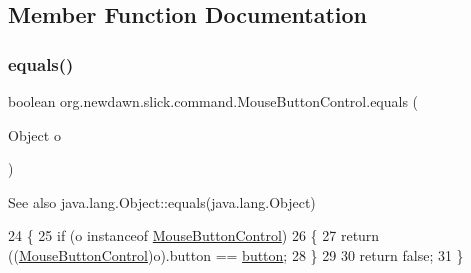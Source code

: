 \subsection{Member Function Documentation}
\mbox{\label{classorg_1_1newdawn_1_1slick_1_1command_1_1_mouse_button_control_afa555e10d087536374f9590a08dfb529}} 
\subsubsection{\texorpdfstring{equals()}{equals()}}
{\footnotesize\ttfamily boolean org.\+newdawn.\+slick.\+command.\+Mouse\+Button\+Control.\+equals (\begin{DoxyParamCaption}\item[{Object}]{o }\end{DoxyParamCaption})\hspace{0.3cm}{\ttfamily [inline]}}

\begin{DoxySeeAlso}{See also}
java.\+lang.\+Object\+::equals(java.\+lang.\+Object) 
\end{DoxySeeAlso}

\begin{DoxyCode}
24                                     \{
25         \textcolor{keywordflow}{if} (o instanceof \mbox{\hyperlink{classorg_1_1newdawn_1_1slick_1_1command_1_1_mouse_button_control_a47ab20a1f4c08a5fc9201c2e14511fe2}{MouseButtonControl}}) 
26         \{
27             \textcolor{keywordflow}{return} ((\mbox{\hyperlink{classorg_1_1newdawn_1_1slick_1_1command_1_1_mouse_button_control_a47ab20a1f4c08a5fc9201c2e14511fe2}{MouseButtonControl}})o).button == \mbox{\hyperlink{classorg_1_1newdawn_1_1slick_1_1command_1_1_mouse_button_control_acb6114b65f6e0fd07d4d820d6bd2c04c}{button}};
28         \}
29         
30         \textcolor{keywordflow}{return} \textcolor{keyword}{false};
31     \}
\end{DoxyCode}
\mbox{\label{classorg_1_1newdawn_1_1slick_1_1command_1_1_mouse_button_control_a8b1f339ce68b34c459cc8202e138ecdf}} 
